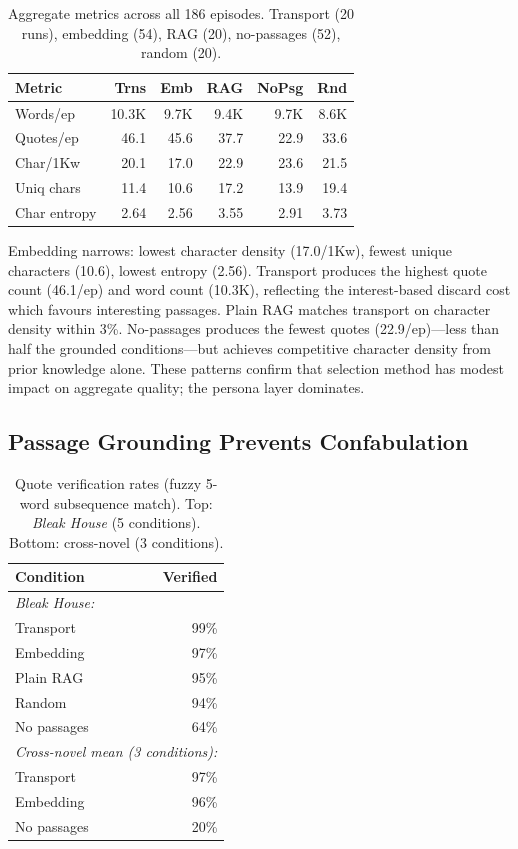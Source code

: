 \documentclass[final]{clv2025}
\begin{document}
\begin{table}[t]
\caption{Aggregate metrics across all 186 episodes.  Transport
  (20 runs), embedding (54), RAG (20), no-passages (52), random (20).}
\label{tab:aggregate}
\begin{tabular}{lrrrrr}
\toprule
Metric & Trns & Emb & RAG & NoPsg & Rnd \\
\midrule
Words/ep    & 10.3K & 9.7K & 9.4K & 9.7K & 8.6K \\
Quotes/ep   & 46.1 & 45.6 & 37.7 & 22.9 & 33.6 \\
Char/1Kw    & 20.1 & 17.0 & 22.9 & 23.6 & 21.5 \\
Uniq chars  & 11.4 & 10.6 & 17.2 & 13.9 & 19.4 \\
Char entropy & 2.64 & 2.56 & 3.55 & 2.91 & 3.73 \\
\bottomrule
\end{tabular}
\end{table}

Embedding narrows: lowest character density (17.0/1Kw), fewest unique
characters (10.6), lowest entropy (2.56).  Transport produces the
highest quote count (46.1/ep) and word count (10.3K), reflecting the
interest-based discard cost which favours interesting passages.
Plain RAG matches transport on character density within 3\%.
No-passages produces the fewest quotes (22.9/ep)---less than half the
grounded conditions---but achieves competitive character density from
prior knowledge alone.  These patterns confirm that selection method
has modest impact on aggregate quality; the persona layer dominates.


\subsection{Passage Grounding Prevents Confabulation}
\label{sec:grounding}
\begin{table}[t]
\caption{Quote verification rates (fuzzy 5-word subsequence match).
  Top: \textit{Bleak House} (5 conditions).  Bottom: cross-novel
  (3 conditions).}
\label{tab:quotes}
\begin{tabular}{lr}
\toprule
Condition & Verified \\
\midrule
\multicolumn{2}{l}{\textit{Bleak House:}} \\
Transport       & 99\% \\
Embedding       & 97\% \\
Plain RAG       & 95\% \\
Random          & 94\% \\
No passages     & 64\% \\
\midrule
\multicolumn{2}{l}{\textit{Cross-novel mean (3 conditions):}} \\
Transport       & 97\% \\
Embedding       & 96\% \\
No passages     & 20\% \\
\bottomrule
\end{tabular}
\end{table}
\end{document}
